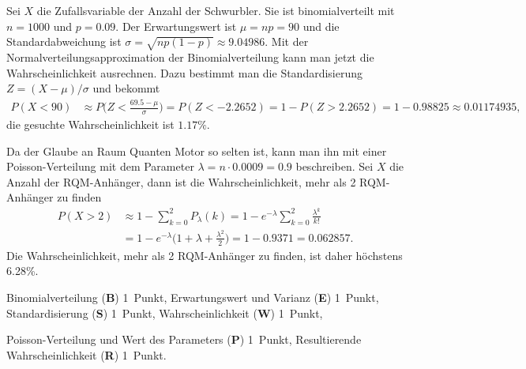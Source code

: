 \begin{loesung}
\begin{teilaufgaben}
\item
Sei $X$ die Zufallsvariable der Anzahl der Schwurbler.
Sie ist binomialverteilt mit $n=1000$ und $p=0.09$.
Der Erwartungswert ist $\mu=np=90$ und die Standardabweichung
ist $\sigma=\sqrt{np(1-p)}\approx 9.04986$.
Mit der Normalverteilungsapproximation der Binomialverteilung
kann man jetzt die Wahrscheinlichkeit ausrechnen.
Dazu bestimmt man die Standardisierung $Z=(X-\mu)/\sigma$ und
bekommt
\begin{align*}
P(X< 90)
&\approx
P\biggl(Z < \frac{69.5 -\mu}{\sigma}\biggr)
=
P(Z < -2.2652)
=
1-P(Z>2.2652)
=
1-0.98825
\approx
0.01174935,
\end{align*}
die gesuchte Wahrscheinlichkeit ist $1.17\%$.
\item
Da der Glaube an Raum Quanten Motor so selten ist, kann man ihn
mit einer
Poisson-Verteilung mit dem Parameter $\lambda = n\cdot 0.0009=0.9$
beschreiben.
Sei $X$ die Anzahl der RQM-Anhänger, dann ist die Wahrscheinlichkeit,
mehr als 2 RQM-Anhänger zu finden
\begin{align*}
P(X>2)
&\approx
1-\sum_{k=0}^2 P_\lambda(k)
=
1-e^{-\lambda} \sum_{k=0}^2 \frac{\lambda^k}{k!}
\\
&=
1-e^{-\lambda}\biggl(1+\lambda+\frac{\lambda^2}{2}\biggr)
=
1- 0.9371
=
0.062857.
\end{align*}
Die Wahrscheinlichkeit, mehr als 2 RQM-Anhänger zu finden, ist daher 
höchstens 6.28\%.
\qedhere
\end{teilaufgaben}
\end{loesung}

\begin{bewertung}
\begin{teilaufgaben}
\item
Binomialverteilung ({\bf B}) 1~Punkt,
Erwartungswert und Varianz ({\bf E}) 1~Punkt,
Standardisierung ({\bf S}) 1~Punkt,
Wahrscheinlichkeit ({\bf W}) 1~Punkt,
\item
Poisson-Verteilung und Wert des Parameters ({\bf P}) 1~Punkt,
Resultierende Wahrscheinlichkeit ({\bf R}) 1~Punkt.
\end{teilaufgaben}
\end{bewertung}



